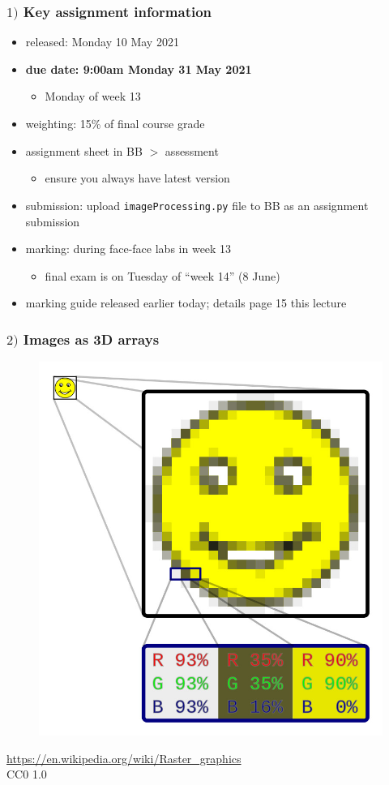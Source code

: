 \documentclass[english,14pt]{beamer}
\begin{document}
\begin{frame}[fragile]

\frametitle{$1)$ Key assignment information}

\begin{itemize}
	\item released: Monday 10 May 2021
	\item \textbf{due date: 9:00am Monday 31 May 2021}
	\begin{itemize}
		\item Monday of week 13
	\end{itemize}
	\item weighting: 15\% of final course grade
	\item assignment sheet in BB $>$ assessment
	\begin{itemize}
		\item ensure you always have latest version
	\end{itemize}
	\item submission: upload \texttt{imageProcessing.py} file to BB as an assignment submission
	\item marking: during face-face labs in week 13
	\begin{itemize}
		\item final exam is on Tuesday of ``week 14'' (8 June)
	\end{itemize}
	\item marking guide released earlier today; details page 15 this lecture	
\end{itemize}

\end{frame}


\begin{frame}[fragile]

\frametitle{$2)$ Images as 3D arrays}
\vspace*{-5mm}
\begin{figure}[ht]
	\centering
	\includegraphics[width=.5\textwidth]{figures/smiley}
\end{figure}
\vspace*{-5mm}
{\footnotesize
\href{https://en.wikipedia.org/wiki/Raster_graphics}{https://en.wikipedia.org/wiki/Raster\_graphics} \\
\vspace*{-1mm}
CC0 1.0}

\end{frame}
\end{document}
